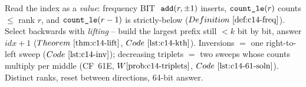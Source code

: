 \begin{recallbox}
Read the index as a \emph{value}: frequency BIT \(\;\texttt{add}(r,\pm1)\)
inserts, \(\texttt{count\_le}(r)\) counts \(\le\) rank \(r\), and
\(\texttt{count\_le}(r-1)\) is strictly-below (\(\defref{c14-freq}\)).
Select backwards with \emph{lifting} -- build the largest prefix still \(<k\)
bit by bit, answer \(\mathit{idx}+1\) (\(\thmref{c14-lift}\),
\(\coderef{c14-kth}\)).  Inversions \(=\) one right-to-left sweep
(\(\coderef{c14-inv}\)); decreasing triplets \(=\) two sweeps whose counts
multiply per middle (CF~61E, \(\probref{c14-triplets}\),
\(\coderef{c14-61-soln}\)).  Distinct ranks, reset between directions, 64-bit
answer.
\end{recallbox}

